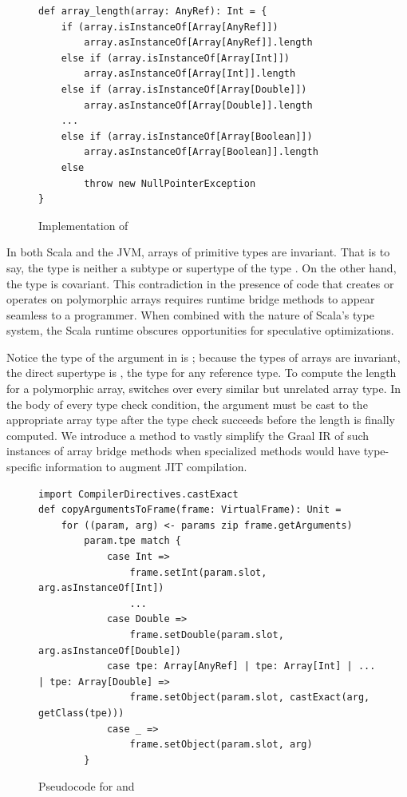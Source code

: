 \begin{figure}[!htb]
\begin{verbatim}
def array_length(array: AnyRef): Int = {
	if (array.isInstanceOf[Array[AnyRef]])       
		array.asInstanceOf[Array[AnyRef]].length
	else if (array.isInstanceOf[Array[Int]])     
		array.asInstanceOf[Array[Int]].length
	else if (array.isInstanceOf[Array[Double]])  
		array.asInstanceOf[Array[Double]].length
 	...
	else if (array.isInstanceOf[Array[Boolean]]) 
		array.asInstanceOf[Array[Boolean]].length
	else 
		throw new NullPointerException
}
\end{verbatim}
\caption{Implementation of }
\label{impl:array-length}
\end{figure}

In both Scala and the JVM, arrays of primitive types are invariant.
That is to say, the type  is neither a subtype or supertype of the type .
On the other hand, the type  is covariant.
This contradiction in the presence of code that creates or operates on polymorphic arrays requires runtime bridge methods to appear seamless to a programmer.
When combined with the nature of Scala's type system, the Scala runtime obscures opportunities for speculative optimizations.

Notice the type of the argument in  is ; because the types of arrays are invariant, the direct supertype is , the type for any reference type.
To compute the length for a polymorphic array,  switches over every similar but unrelated array type.
In the body of every type check condition, the argument must be cast to the appropriate array type after the type check succeeds before the length is finally computed.
We introduce a method to vastly simplify the Graal IR of such instances of array bridge methods when specialized methods would have type-specific information to augment JIT compilation.

\begin{figure}[!htb]
\begin{verbatim}
import CompilerDirectives.castExact
def copyArgumentsToFrame(frame: VirtualFrame): Unit = 
	for ((param, arg) <- params zip frame.getArguments) 
		param.tpe match {
			case Int =>
				frame.setInt(param.slot, arg.asInstanceOf[Int])
				...
			case Double =>
				frame.setDouble(param.slot, arg.asInstanceOf[Double])	
			case tpe: Array[AnyRef] | tpe: Array[Int] | ... | tpe: Array[Double] =>
				frame.setObject(param.slot, castExact(arg, getClass(tpe)))
			case _ =>
				frame.setObject(param.slot, arg)
		}
\end{verbatim}
\caption{Pseudocode for  and }
\label{impl:specialized-copy-arguments}
\end{figure}

